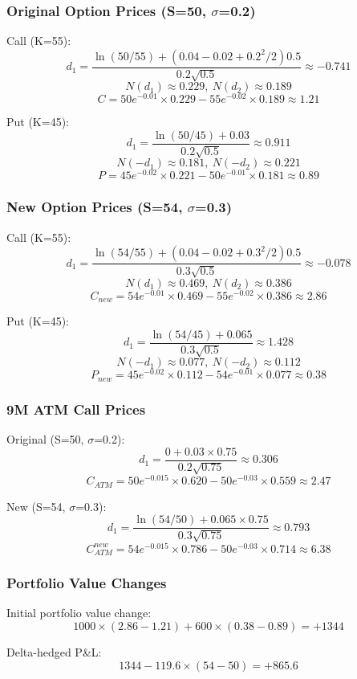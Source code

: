 \documentclass{article}
\begin{document}
\subsubsection*{Original Option Prices (S=50, $\sigma$=0.2)}

Call (K=55):
\[
d_1 = \frac{\ln(50/55)+(0.04-0.02+0.2^2/2)0.5}{0.2\sqrt{0.5}} \approx -0.741
\]
\[
N(d_1) \approx 0.229,\ N(d_2) \approx 0.189
\]
\[
C = 50e^{-0.01}\times0.229 - 55e^{-0.02}\times0.189 \approx 1.21
\]

Put (K=45):
\[
d_1 = \frac{\ln(50/45)+0.03}{0.2\sqrt{0.5}} \approx 0.911
\]
\[
N(-d_1) \approx 0.181,\ N(-d_2) \approx 0.221
\]
\[
P = 45e^{-0.02}\times0.221 - 50e^{-0.01}\times0.181 \approx 0.89
\]

\subsubsection*{New Option Prices (S=54, $\sigma$=0.3)}

Call (K=55):
\[
d_1 = \frac{\ln(54/55)+(0.04-0.02+0.3^2/2)0.5}{0.3\sqrt{0.5}} \approx -0.078
\]
\[
N(d_1) \approx 0.469,\ N(d_2) \approx 0.386
\]
\[
C_{new} = 54e^{-0.01}\times0.469 - 55e^{-0.02}\times0.386 \approx 2.86
\]

Put (K=45):
\[
d_1 = \frac{\ln(54/45)+0.065}{0.3\sqrt{0.5}} \approx 1.428
\]
\[
N(-d_1) \approx 0.077,\ N(-d_2) \approx 0.112
\]
\[
P_{new} = 45e^{-0.02}\times0.112 - 54e^{-0.01}\times0.077 \approx 0.38
\]

\subsubsection*{9M ATM Call Prices}

Original (S=50, $\sigma$=0.2):
\[
d_1 = \frac{0+0.03\times0.75}{0.2\sqrt{0.75}} \approx 0.306
\]
\[
C_{ATM} = 50e^{-0.015}\times0.620 - 50e^{-0.03}\times0.559 \approx 2.47
\]

New (S=54, $\sigma$=0.3):
\[
d_1 = \frac{\ln(54/50)+0.065\times0.75}{0.3\sqrt{0.75}} \approx 0.793
\]
\[
C_{ATM}^{new} = 54e^{-0.015}\times0.786 - 50e^{-0.03}\times0.714 \approx 6.38
\]

\subsubsection*{Portfolio Value Changes}

Initial portfolio value change:
\[
1000 \times (2.86 - 1.21) + 600 \times (0.38 - 0.89) = +1344
\]

Delta-hedged P\&L:
\[
1344 - 119.6 \times (54 - 50) = +865.6
\]
\end{document}
